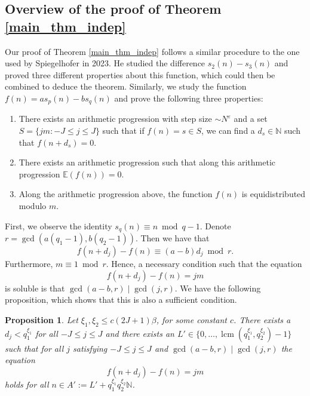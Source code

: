 \documentclass[12pt]{amsart}
\renewcommand{\leq}{\leqslant}
\DeclareMathOperator{\lcm}{lcm}
\newtheorem{proposition}[theorem]{Proposition}
\theoremstyle{definition}
\numberwithin{equation}{section}
\newcommand\NN{\mathbb{N}}
\numberwithin{equation}{section}
\begin{document}
\subsection{Overview of the proof of Theorem \ref{main_thm_indep}}

Our proof of Theorem \ref{main_thm_indep} follows a similar procedure to the one used by Spiegelhofer \cite{Spiegelhofer2023a} in 2023. He studied the difference $s_2(n)-s_3(n)$ and proved three different properties about this function, which could then be combined to deduce the theorem. Similarly, we study the function $f(n)=as_p(n)-bs_q(n)$ and prove the following three properties:
\begin{enumerate}
	\item There exists an arithmetic progression with step size $\sim N^{\varepsilon}$ and a set $S=\{jm:-J\leq j\leq J\}$ such that if $f(n)=s\in S$, we can find a $d_s\in \NN$ such that $f(n+d_s)=0$.
	\item There exists an arithmetic progression such that along this arithmetic progression $\mathbb{E}(f(n))=0$.
	\item Along the arithmetic progression above, the function $f(n)$ is equidistributed modulo $m$.
\end{enumerate}

First, we observe the identity $s_q(n)\equiv n \bmod q-1$. Denote $r= \gcd(a(q_1-1),b(q_2-1))$. Then we have that
\[
	f(n+d_j)-f(n) \equiv (a-b)d_j \bmod r.
\]
Furthermore, $m \equiv 1 \bmod r$. Hence, a necessary condition such that the equation
\[
	f(n+d_j)-f(n)=jm
\]
is soluble is that $\gcd(a-b,r)\mid \gcd(j,r)$. We have the following proposition, which shows that this is also a sufficient condition.
\begin{proposition}\label{prop_shift}
	Let $\xi_1, \xi_2\leq c(2J+1)\beta$, for some constant $c$. There exists a $d_j<q_1^{\xi_1}$ for all $-J\leq j\leq J$ and there exists an $L' \in \{0,\dots,\lcm(q_1^{\xi_1},q_2^{\xi_2})-1\}$ such that for all $j$ satisfying $-J\leq j\leq J$ and $\gcd(a-b,r)\mid \gcd(j,r)$ the equation
	\[
		f(n+d_j)-f(n)=jm
	\]
    holds for all $n\in A':=L'+q_1^{\xi_1}q_2^{\xi_2}\NN$.
\end{proposition}
\end{document}
